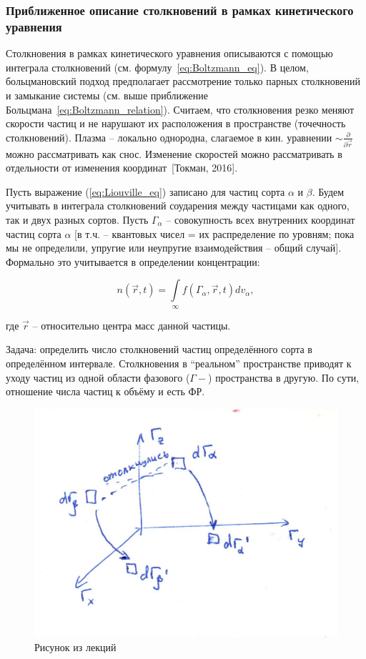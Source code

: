 \documentclass[10pt, a4paper]{article}
\newcommand{\Tokman}{~[Токман, 2016]}
\begin{document}
\subsubsection{Приближенное описание столкновений в рамках кинетического уравнения}

Столкновения в рамках кинетического уравнения описываются с помощью интеграла столкновений (см. формулу~\ref{eq:Boltzmann_eq}). В целом, больцмановский подход предполагает рассмотрение только парных столкновений и замыкание системы (см. выше приближение Больцмана~\ref{eq:Boltzmann_relation}). Считаем, что столкновения резко меняют скорости частиц и не нарушают их расположения в пространстве (точечность столкновений). Плазма -- локально однородна, слагаемое в кин. уравнении $\sim \frac{\partial}{\partial \vec{r}}$ можно рассматривать как снос. Изменение скоростей можно рассматривать в отдельности от изменения координат\Tokman.

Пусть выражение (\ref{eq:Liouville_eq}) записано для частиц сорта $\alpha$ и $\beta$. Будем учитывать в интеграла столкновений соударения между частицами как одного, так и двух разных сортов. Пусть $\Gamma_\alpha$ -- совокупность всех внутренних координат частиц сорта $\alpha$ [в т.ч. -- квантовых чисел = их распределение по уровням; пока мы не определили, упругие или неупругие взаимодействия -- общий случай]. Формально это учитывается в определении концентрации:

\begin{equation*}
	n(\vec{r}, t) = \int\limits_{\infty}f(\Gamma_\alpha,\vec{r},t)dv_\alpha,
\end{equation*}

где $\vec{r}$ -- относительно центра масс данной частицы.

Задача: определить число столкновений частиц определённого сорта в определённом интервале. Столкновения в ``реальном'' пространстве приводят к уходу частиц из одной области фазового ($\Gamma-$) пространства в другую. По сути, отношение числа частиц к объёму и есть ФР.

\begin{figure}[ht]
	\begin{center}
		\includegraphics[width=0.45\linewidth]{boltzmann_collision_term.pdf}
	\end{center}
	\caption{Рисунок из лекций}
	\label{fig:boltzmann_collision_term}
\end{figure}
\end{document}
